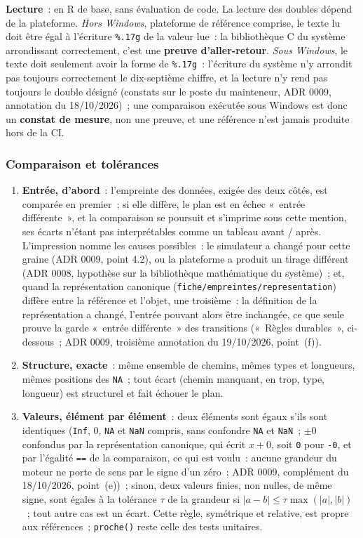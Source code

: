 \documentclass[a4paper,11pt]{article}
\newcommand{\code}[1]{\texttt{\small #1}}
\begin{document}
\noindent
\textbf{Lecture}~: en R de base, sans évaluation de code. La lecture des
doubles dépend de la plateforme. \emph{Hors Windows}, plateforme de référence
comprise, le texte lu doit être égal à l'écriture \code{\%.17g} de la valeur
lue~: la bibliothèque C du système arrondissant correctement, c'est une
\textbf{preuve d'aller-retour}. \emph{Sous Windows}, le texte doit seulement
avoir la forme de \code{\%.17g}~: l'écriture du système n'y arrondit pas
toujours correctement le dix-septième chiffre, et la lecture n'y rend pas
toujours le double désigné (constats sur le poste du mainteneur, ADR 0009,
annotation du 18/10/2026)~; une comparaison exécutée sous Windows est donc un
\textbf{constat de mesure}, non une preuve, et une référence n'est jamais
produite hors de la CI.

\subsubsection*{Comparaison et tolérances}

\begin{enumerate}[leftmargin=*, itemsep=2pt]
  \item \textbf{Entrée, d'abord}~: l'empreinte des données, exigée des deux
    côtés, est comparée en premier~; si elle diffère, le plan est en échec
    «~entrée différente~», et la comparaison se poursuit et s'imprime sous
    cette mention, ses écarts n'étant pas interprétables comme un tableau
    avant / après. L'impression nomme les causes possibles~: le simulateur a
    changé pour cette graine (ADR 0009, point 4.2), ou la plateforme a
    produit un tirage différent (ADR 0008, hypothèse sur la bibliothèque
    mathématique du système)~; et, quand la représentation canonique
    (\code{fiche/empreintes/representation}) diffère entre la référence et
    l'objet, une troisième~: la définition de la représentation a changé,
    l'entrée pouvant alors être inchangée, ce que seule prouve la garde
    «~entrée différente~» des transitions («~Règles durables~», ci-dessous~;
    ADR 0009, troisième annotation du 19/10/2026, point~(f)).
  \item \textbf{Structure, exacte}~: même ensemble de chemins, mêmes types et
    longueurs, mêmes positions des \code{NA}~; tout écart (chemin manquant,
    en trop, type, longueur) est structurel et fait échouer le plan.
  \item \textbf{Valeurs, élément par élément}~: deux éléments sont égaux
    s'ils sont identiques (\code{Inf}, 0, \code{NA} et \code{NaN} compris,
    sans confondre \code{NA} et \code{NaN}~; $\pm 0$ confondus par la
    représentation canonique, qui écrit $x + 0$, soit \code{0} pour
    \code{-0}, et par l'égalité \code{==} de la comparaison, ce qui est
    voulu~: aucune grandeur du moteur ne porte de sens par le signe d'un
    zéro~; ADR 0009, complément du 18/10/2026, point~(e))~; sinon, deux
    valeurs finies, non
    nulles, de même signe, sont égales à la tolérance $\tau$ de la grandeur
    si $|a - b| \le \tau \max(|a|, |b|)$~; tout autre cas est un écart.
    Cette règle, symétrique et relative, est propre aux références~;
    \code{proche()} reste celle des tests unitaires.
\end{enumerate}
\end{document}
